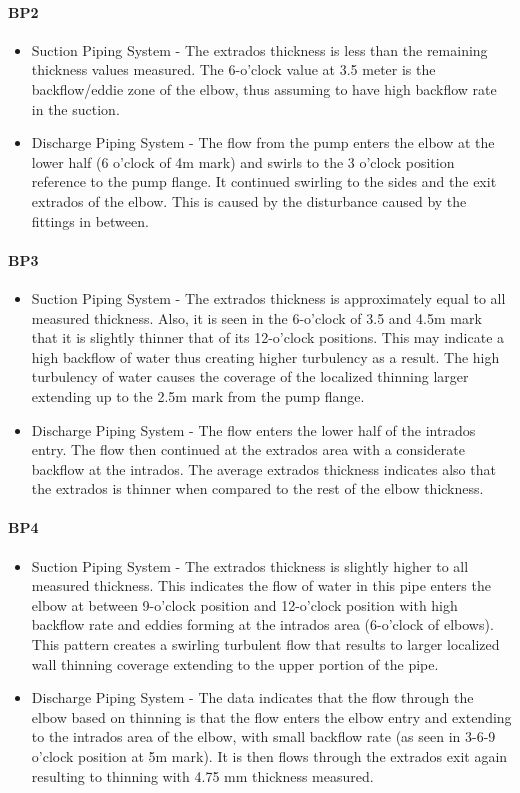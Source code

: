\paragraph{\textbf{BP2}}
\begin{itemize}
	\item Suction Piping System - The extrados thickness is less than the remaining thickness values measured. The 6-o'clock value at 3.5 meter is the backflow/eddie zone of the elbow, thus assuming to have high backflow rate in the suction.
	\item	Discharge Piping System - The flow from the pump enters the elbow at the lower half (6 o'clock of 4m mark) and swirls to the 3 o'clock position reference to the pump flange. It continued swirling to the sides and the exit extrados of the elbow. This is caused by the disturbance caused by the fittings in between.
\end{itemize}

\paragraph{\textbf{BP3}}
\begin{itemize}
	\item Suction Piping System - The extrados thickness is approximately equal to all measured thickness. Also, it is seen in the 6-o'clock of 3.5 and 4.5m mark that it is slightly thinner that of its 12-o'clock positions. This may indicate a high backflow of water thus creating higher turbulency as a result. The high turbulency of water causes the coverage of the localized thinning larger extending up to the 2.5m mark from the pump flange.
	\item	Discharge Piping System - The flow enters the lower half of the intrados entry. The flow then continued at the extrados area with a considerate backflow at the intrados. The average extrados thickness indicates also that the extrados is thinner when compared to the rest of the elbow thickness.
\end{itemize}

\paragraph{\textbf{BP4}}
\begin{itemize}
	\item Suction Piping System - The extrados thickness is slightly higher to all measured thickness. This indicates the flow of water in this pipe enters the elbow at between 9-o'clock position and 12-o'clock position with high backflow rate and eddies forming at the intrados area (6-o'clock of elbows). This pattern creates a swirling turbulent flow that results to larger localized wall thinning coverage extending to the upper portion of the pipe.
	\item	Discharge Piping System - The data indicates that the flow through the elbow based on thinning is that the flow enters the elbow entry and extending to the intrados area of the elbow, with small backflow rate (as seen in 3-6-9 o'clock position at 5m mark). It is then flows through the extrados exit again resulting to thinning with 4.75 mm thickness measured.
\end{itemize}

